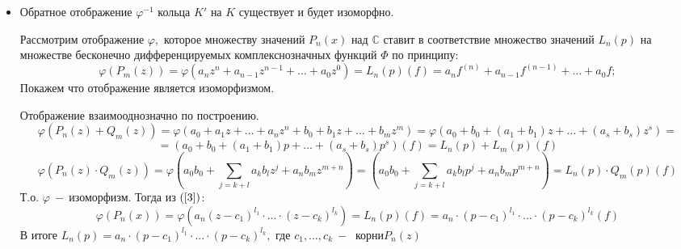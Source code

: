 \begin{itemize}
    \item Обратное отображение $\varphi^{-1}$ кольца $K'$ на $K$ существует и будет изоморфно.\par
    Рассмотрим отображение $\varphi,$ которое множеству значений $P_n(x)$ над $\mathds{C}$ ставит в соответствие множество значений $L_n(p)$ на множестве бесконечно дифференцируемых комплекснозначных функций $\varPhi$ по принципу:
    $$\varphi(P_m(z))=\varphi(a_nz^n+a_{n-1}z^{n-1}+\dots+a_0z^0)=L_n(p)(f)=a_nf^{(n)}+a_{n-1}f^{(n-1)}+\dots+a_0f;$$
    Покажем что отображение является изоморфизмом.\par Отображение взаимооднозначно по построению.
    $$\varphi(P_n(z)+Q_m(z))=\varphi(a_0+a_1z+\dots+a_nz^n+b_0+b_1z+\dots+b_mz^m)=\varphi(a_0+b_0+(a_1+b_1)z+\dots+(a_s+b_s)z^s)=$$$$=(a_0+b_0+(a_1+b_1)p+\dots+(a_s+b_s)p^s)(f)=L_n(p)+L_m(p)(f)$$
    $$\varphi(P_n(z)\cdot Q_m(z))=\varphi(a_0b_0+\displaystyle\sum_{j=k+l}a_kb_lz^j+a_nb_mz^{m+n})=(a_0b_0+\displaystyle\sum_{j=k+l}a_kb_lp^j+a_nb_mp^{m+n})=L_n(p)\cdot Q_m(p)(f)$$
    Т.о. $\varphi~-~$изоморфизм. Тогда из $(\ref{3})$: $$\varphi(P_n(x))=\varphi(a_n(z-c_1)^{l_1}\cdot ...\cdot (z-c_k)^{l_k})= L_n(p)(f)=a_n\cdot (p-c_1)^{l_1}\cdot ... \cdot (p-c_k)^{l_k}(f)$$
    В итоге  $L_n(p)=a_n\cdot (p-c_1)^{l_1}\cdot ... \cdot (p-c_k)^{l_k},$ где $c_1,\dots,c_k ~-~$ корни$P_n(z)$
    
\end{itemize}
